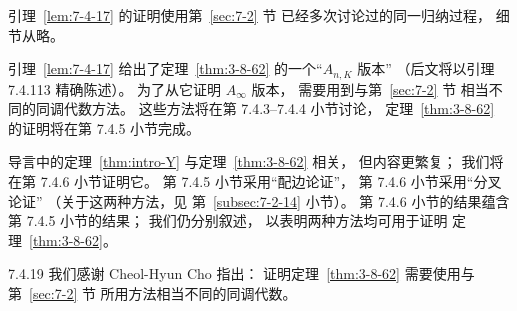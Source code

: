 引理~\ref{lem:7-4-17}
的证明使用第~\ref{sec:7-2} 节
已经多次讨论过的同一归纳过程，
细节从略。

引理~\ref{lem:7-4-17}
给出了定理~\ref{thm:3-8-62}
的一个“\(A_{n,K}\) 版本”
（后文将以引理 7.4.113 精确陈述）。
为了从它证明 \(A_\infty\) 版本，
需要用到与第~\ref{sec:7-2} 节
相当不同的同调代数方法。
这些方法将在第 7.4.3--7.4.4 小节讨论，
定理~\ref{thm:3-8-62}
的证明将在第 7.4.5 小节完成。

导言中的定理~\ref{thm:intro-Y}
与定理~\ref{thm:3-8-62} 相关，
但内容更繁复；
我们将在第 7.4.6 小节证明它。
第 7.4.5 小节采用“配边论证”，
第 7.4.6 小节采用“分叉论证”
（关于这两种方法，见
第~\ref{subsec:7-2-14} 小节）。
第 7.4.6 小节的结果蕴含
第 7.4.5 小节的结果；
我们仍分别叙述，
以表明两种方法均可用于证明
定理~\ref{thm:3-8-62}。

\begin{remark}{7.4.19}\label{rem:7-4-19}
我们感谢 Cheol-Hyun Cho 指出：
证明定理~\ref{thm:3-8-62}
需要使用与第~\ref{sec:7-2} 节
所用方法相当不同的同调代数。
\end{remark}
